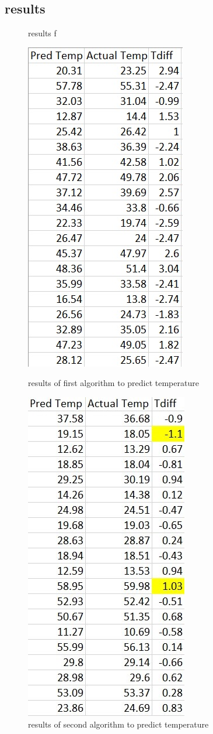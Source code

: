 \documentclass[10pt]{article}
\begin{document}
\begin{appendices}
\section{results}
\begin{figure}[h]
\caption{results f}
\includegraphics[scale=0.8]{7}
\caption{results of first algorithm to predict temperature}
\includegraphics[scale=0.8]{8}
\caption{results of second algorithm to predict temperature}
\end{figure}
\end{appendices}


\end{document}
